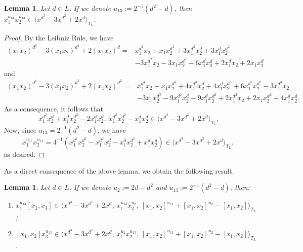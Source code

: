 \documentclass[a4paper,reqno]{amsart}
\newtheorem{lemma}[theorem]{Lemma}
\theoremstyle{definition}
\numberwithin{equation}{section}
\numberwithin{theorem}{section}
\begin{document}
\begin{lemma}\label{lem: UT_3^e1+e2 u_13u_13}
    Let $d\in L$. If we denote $u_{13}:=2^{-1}(d^2 - d)$, then $x_1^{u_{13}}x_2^{u_{13}}\in \langle x^{d^3}-3x^{d^2}+2x^{d}\rangle_{T_L}$.
\end{lemma}
\begin{proof}
 By the Leibniz Rule, we have
    \begin{align*}
        (x_1x_2)^{d^3} -3(x_1x_2)^{d^2} +2(x_1x_2)^d=&x_1^{d^3}x_2+ x_1 x_2^{d^3}+ 3x_1^{d^2}x_2^d + 3 x_1^{d}x_2^{d^2} \\ 
        &-3x_1^{d^2}x_2-3x_1x_2^{d^2}-6x_1^dx_2^d 
        +2x_1^dx_2+2x_1x_2^d
    \end{align*}
    and
    \begin{align*}
        (x_1x_2)^{d^4} -3(x_1x_2)^{d^3} +2 (x_1x_2)^{d^2} = &x_1^{d^4}x_2+ x_1 x_2^{d^4}+ 4x_1^{d^3}x_2^d + 4 x_1^{d}x_2^{d^3}+ 6x_1^{d^2}x_2^{d^2}
        -3x_1^{d^3}x_2\\
        &-3 x_1 x_2^{d^3}-9x_1^{d^2}x_2^d -9 x_1^{d}x_2^{d^2}
        +2x_1^{d^2}x_2+2x_1x_2^{d^2}+4x_1^dx_2^d.
    \end{align*}
    As a consequence, it follows that 
    $$x_1^{d^2}x_2^d + x_1^{d}x_2^{d^2}-2x_1^dx_2^d, \ x_1^{d^2}x_2^{d^2}-x_1^dx_2^d \in \langle x^{d^3}-3x^{d^2}+2x^{d} \rangle_{T_L}.$$
    Now, since  $u_{13}=2^{-1}(d^2-d)$, we have
    $$
    x_1^{u_{13}} x_2^{u_{13}}
    =4^{-1}( x_1^{d^2}x_2^{d^2} - x_1^{d^2}x_2^{d}-x_1^{d}x_2^{d^2}+ x_1^{d}x_2^{d})\in \langle x^{d^3}-3x^{d^2}+2x^{d}\rangle_{T_L},
    $$
    as desired.    
\end{proof}

As a direct consequence of the above lemma, we obtain the following result.
\begin{lemma}\label{lem:  UT_3^e1+e2 u_13 com}
   Let $d\in L$. If we denote $u_{2}:=2d -d^2$ and $u_{13}:=2^{-1}(d^2 - d)$, then:
   \begin{enumerate}
       \item $x_1^{u_{13}} [x_2,x_3]\in \langle x^{d^3}-3x^{d^2}+2x^{d},\ x_1^{u_{13}}x_2^{u_{2}}, \ [x_1,x_2]^{u_{13}}+ [x_1,x_2]^{u_{2}} - [x_1,x_2]\rangle_{T_L}$;
\vspace{1mm}

\item $ [x_1,x_2] x_3^{u_{13}}\in \langle x^{d^3}-3x^{d^2}+2x^{d},\ x_1^{u_{2}}x_2^{u_{13}}, \ [x_1,x_2]^{u_{13}}+ [x_1,x_2]^{u_{2}} - [x_1,x_2]\rangle_{T_L}$.
   \end{enumerate}
\end{lemma}
\end{document}
